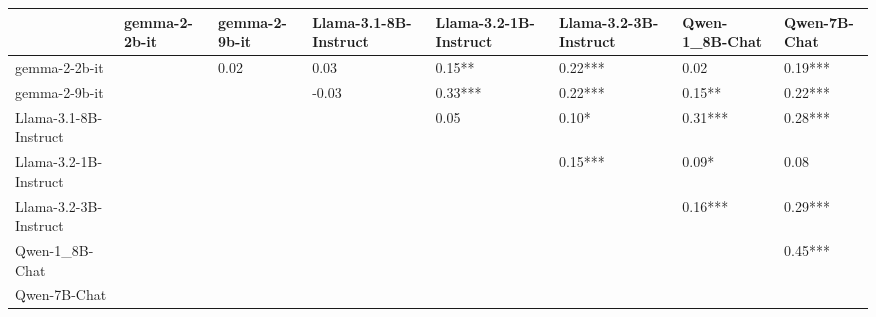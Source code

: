 \begin{table}[ht]
\centering
\scriptsize
\begin{tabular}{llllllll}
\toprule
                      & gemma-2-2b-it & gemma-2-9b-it & Llama-3.1-8B-Instruct & Llama-3.2-1B-Instruct & Llama-3.2-3B-Instruct & Qwen-1\_8B-Chat & Qwen-7B-Chat \\
\midrule
        gemma-2-2b-it &               &          0.02 &                  0.03 &                0.15** &               0.22*** &           0.02 &      0.19*** \\
        gemma-2-9b-it &               &               &                 -0.03 &               0.33*** &               0.22*** &         0.15** &      0.22*** \\
Llama-3.1-8B-Instruct &               &               &                       &                  0.05 &                 0.10* &        0.31*** &      0.28*** \\
Llama-3.2-1B-Instruct &               &               &                       &                       &               0.15*** &          0.09* &         0.08 \\
Llama-3.2-3B-Instruct &               &               &                       &                       &                       &        0.16*** &      0.29*** \\
       Qwen-1\_8B-Chat &               &               &                       &                       &                       &                &      0.45*** \\
         Qwen-7B-Chat &               &               &                       &                       &                       &                &              \\
\bottomrule
\end{tabular}
\end{table}